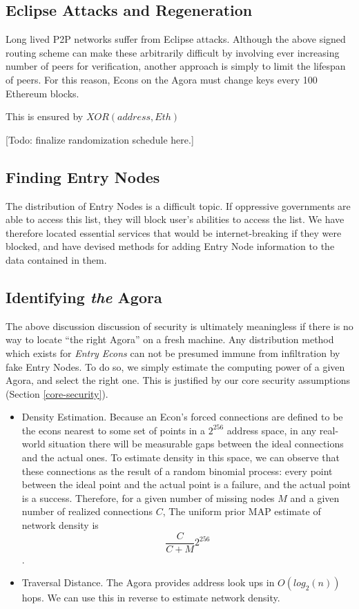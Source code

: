 \documentclass{article}
\begin{document}
\subsection{Eclipse Attacks and Regeneration}
\label{agora-regen}

Long lived P2P networks suffer from Eclipse attacks. Although the
above signed routing scheme can make these arbitrarily difficult by
involving ever increasing number of peers for verification, another
approach is simply to limit the lifespan of peers. For this reason,
Econs on the Agora must change keys every 100 Ethereum blocks.

This is ensured by $XOR(address, Eth)$

[Todo: finalize randomization schedule here.]

\subsection{Finding Entry Nodes}
\label{bootstrapping}

The distribution of Entry Nodes is a difficult topic. If oppressive governments are able to access this list, they will block user's abilities to access the list. We have therefore located essential services that would be internet-breaking if they were blocked, and have devised methods for adding Entry Node information to the data contained in them.

\subsection{Identifying \emph{the} Agora}

The above discussion discussion of security is ultimately meaningless if there is no way to locate ``the right Agora'' on a fresh machine. Any distribution method which exists for \emph{Entry Econs} can not be presumed immune from infiltration by fake Entry Nodes. To do so, we simply estimate the computing power of a given Agora, and select the right one. This is justified by our core security assumptions (Section \ref{core-security}).

\begin{itemize}
    \item Density Estimation. Because an Econ's forced connections are defined to be the econs nearest to some set of points in a $2^{256}$ address space, in any real-world situation there will be measurable gaps between the ideal connections and the actual ones. To estimate density in this space, we can observe that these connections as the result of a random binomial process: every point between the ideal point and the actual point is a failure, and the actual point is a success. Therefore, for a given number of missing nodes $M$ and a given number of realized connections $C$, The uniform prior MAP estimate of network density is $$\frac{C}{C + M} 2^{256}$$.
    \item Traversal Distance. The Agora provides address look ups in $O(log_2(n))$ hops. We can use this in reverse to estimate network density.
\end{itemize}
\end{document}
